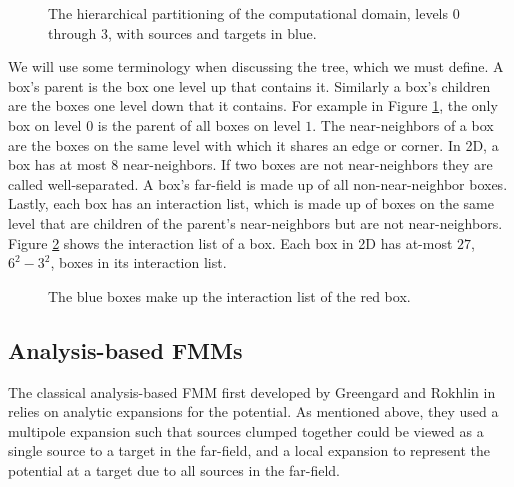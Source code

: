 \documentclass[11pt, oneside]{article}   	%
\begin{document}
\begin{figure}[h]
\caption{The hierarchical partitioning of the computational domain, levels $0$ through $3$, with sources and targets in blue.}
\label{fig:4}
\centering
\end{figure}

We will use some terminology when discussing the tree, which we must define. A box's parent is the box one level up that contains it. Similarly a box's children are the boxes one level down that it contains. For example in Figure \ref{fig:4}, the only box on level $0$ is the parent of all boxes on level $1$. The near-neighbors of a box are the boxes on the same level with which it shares an edge or corner. In 2D, a box has at most $8$ near-neighbors. If two boxes are not near-neighbors they are called well-separated. A box's far-field is made up of all non-near-neighbor boxes. Lastly, each box has an interaction list, which is made up of boxes on the same level that are children of the parent's near-neighbors but are not near-neighbors. Figure \ref{fig:5} shows the interaction list of a box. Each box in 2D has at-most $27$, $6^2-3^2$, boxes in its interaction list.

\begin{figure}[h]
\caption{The blue boxes make up the interaction list of the red box.}
\label{fig:5}
\centering
\end{figure}

\subsection{Analysis-based FMMs}
The classical analysis-based FMM first developed by Greengard and Rokhlin in \cite{GR} relies on analytic expansions for the potential. As mentioned above, they used a multipole expansion such that sources clumped together could be viewed as a single source to a target in the far-field, and a local expansion to represent the potential at a target due to all sources in the far-field.
\end{document}
